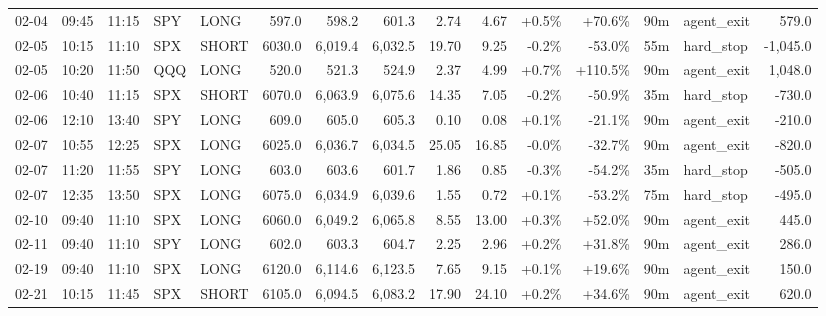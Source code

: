 \documentclass[11pt,a4paper,twoside]{article}
\begin{document}
\begin{landscape}
\begin{center}
\begin{longtable}{>{\color{txtmain}}l l l l l r r r r r r r r >{\color{txtmain}}l r}
02-04 & 09:45 & 11:15 & SPY & LONG & 597.0 & 598.2 & 601.3 & 2.74 & 4.67 & \textcolor{wingreen}{+0.5\%} & \textcolor{wingreen}{+70.6\%} & 90m & agent\_exit & \textcolor{wingreen}{579.0} \\
02-05 & 10:15 & 11:10 & SPX & SHORT & 6030.0 & 6,019.4 & 6,032.5 & 19.70 & 9.25 & \textcolor{lossred}{-0.2\%} & \textcolor{lossred}{-53.0\%} & 55m & hard\_stop & \textcolor{lossred}{-1,045.0} \\
02-05 & 10:20 & 11:50 & QQQ & LONG & 520.0 & 521.3 & 524.9 & 2.37 & 4.99 & \textcolor{wingreen}{+0.7\%} & \textcolor{wingreen}{+110.5\%} & 90m & agent\_exit & \textcolor{wingreen}{1,048.0} \\
02-06 & 10:40 & 11:15 & SPX & SHORT & 6070.0 & 6,063.9 & 6,075.6 & 14.35 & 7.05 & \textcolor{lossred}{-0.2\%} & \textcolor{lossred}{-50.9\%} & 35m & hard\_stop & \textcolor{lossred}{-730.0} \\
02-06 & 12:10 & 13:40 & SPY & LONG & 609.0 & 605.0 & 605.3 & 0.10 & 0.08 & \textcolor{wingreen}{+0.1\%} & \textcolor{lossred}{-21.1\%} & 90m & agent\_exit & \textcolor{lossred}{-210.0} \\
02-07 & 10:55 & 12:25 & SPX & LONG & 6025.0 & 6,036.7 & 6,034.5 & 25.05 & 16.85 & \textcolor{lossred}{-0.0\%} & \textcolor{lossred}{-32.7\%} & 90m & agent\_exit & \textcolor{lossred}{-820.0} \\
02-07 & 11:20 & 11:55 & SPY & LONG & 603.0 & 603.6 & 601.7 & 1.86 & 0.85 & \textcolor{lossred}{-0.3\%} & \textcolor{lossred}{-54.2\%} & 35m & hard\_stop & \textcolor{lossred}{-505.0} \\
02-07 & 12:35 & 13:50 & SPX & LONG & 6075.0 & 6,034.9 & 6,039.6 & 1.55 & 0.72 & \textcolor{wingreen}{+0.1\%} & \textcolor{lossred}{-53.2\%} & 75m & hard\_stop & \textcolor{lossred}{-495.0} \\
02-10 & 09:40 & 11:10 & SPX & LONG & 6060.0 & 6,049.2 & 6,065.8 & 8.55 & 13.00 & \textcolor{wingreen}{+0.3\%} & \textcolor{wingreen}{+52.0\%} & 90m & agent\_exit & \textcolor{wingreen}{445.0} \\
02-11 & 09:40 & 11:10 & SPY & LONG & 602.0 & 603.3 & 604.7 & 2.25 & 2.96 & \textcolor{wingreen}{+0.2\%} & \textcolor{wingreen}{+31.8\%} & 90m & agent\_exit & \textcolor{wingreen}{286.0} \\
02-19 & 09:40 & 11:10 & SPX & LONG & 6120.0 & 6,114.6 & 6,123.5 & 7.65 & 9.15 & \textcolor{wingreen}{+0.1\%} & \textcolor{wingreen}{+19.6\%} & 90m & agent\_exit & \textcolor{wingreen}{150.0} \\
02-21 & 10:15 & 11:45 & SPX & SHORT & 6105.0 & 6,094.5 & 6,083.2 & 17.90 & 24.10 & \textcolor{wingreen}{+0.2\%} & \textcolor{wingreen}{+34.6\%} & 90m & agent\_exit & \textcolor{wingreen}{620.0} \\

\end{longtable}
\end{center}
\end{landscape}
\end{document}
